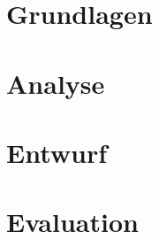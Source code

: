 



 

 \tableofcontents
 

 \printglossary[title={Abkürzungsverzeichnis}] 
 
 
 
 
 
 \chapter{Grundlagen}
 
 
 
  
 
 
  
 
 
 
 
 
 
 \chapter{Analyse}
 
 
 
 
 
 

 
 
 
 \chapter{Entwurf}
  
 
 
 
  
 \chapter{Evaluation}
 

